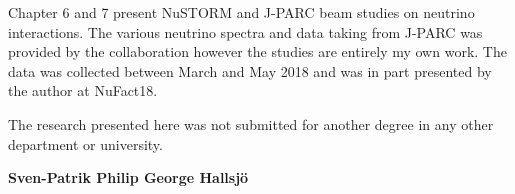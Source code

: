 Chapter 6 and 7 present NuSTORM and J-PARC beam studies on neutrino interactions. The various neutrino spectra and data taking from J-PARC was provided by the collaboration however the studies are entirely my own work. The data was collected between March and May 2018 and was in part presented by the author at NuFact18.

The research presented here was not submitted for another degree in any other department or university.


\begin{flushright} \textbf{Sven-Patrik Philip George Hallsj{\"o}}\end{flushright}
